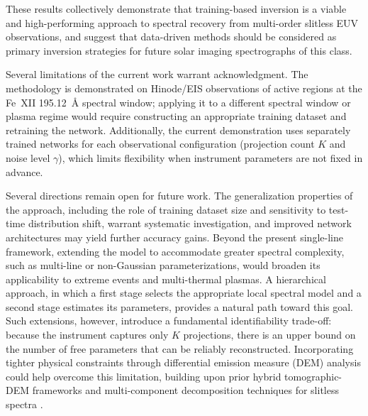 \documentclass[linenumbers,twocolumn]{aastex7}
\begin{document}
These results collectively demonstrate that training-based inversion is a
viable and high-performing approach to spectral recovery from multi-order
slitless EUV observations, and suggest that data-driven methods should be
considered as primary inversion strategies for future solar imaging
spectrographs of this class.

Several limitations of the current work warrant acknowledgment. The methodology
is demonstrated on Hinode/EIS observations of active regions at the
Fe~XII \SI{195.12}{\angstrom} spectral window; applying it to a different
spectral window or plasma regime would require constructing an appropriate
training dataset and retraining the network. Additionally, the current
demonstration uses separately trained networks for each observational
configuration (projection count $K$ and noise level $\gamma$), which limits
flexibility when instrument parameters are not fixed in advance.

Several directions remain open for future work. The generalization properties of
the approach, including the role of training dataset size and sensitivity to
test-time distribution shift, warrant systematic investigation, and improved
network architectures may yield further accuracy gains. Beyond the present
single-line framework, extending the model to accommodate greater spectral
complexity, such as multi-line or non-Gaussian parameterizations, would broaden
its applicability to extreme events and multi-thermal plasmas. A hierarchical
approach, in which a first stage selects the appropriate local spectral model
and a second stage estimates its parameters, provides a natural path toward this
goal. Such extensions, however, introduce a fundamental identifiability
trade-off: because the instrument captures only $K$ projections, there is an
upper bound on the number of free parameters that can be reliably reconstructed.
Incorporating tighter physical constraints through differential emission measure
(DEM) analysis could help overcome this limitation, building upon prior hybrid
tomographic-DEM frameworks \citep{frazin2005combination} and multi-component
decomposition techniques for slitless spectra \citep{cheung2019multi,
winebarger2019unfolding, athiray2025systematic}.





\end{document}

